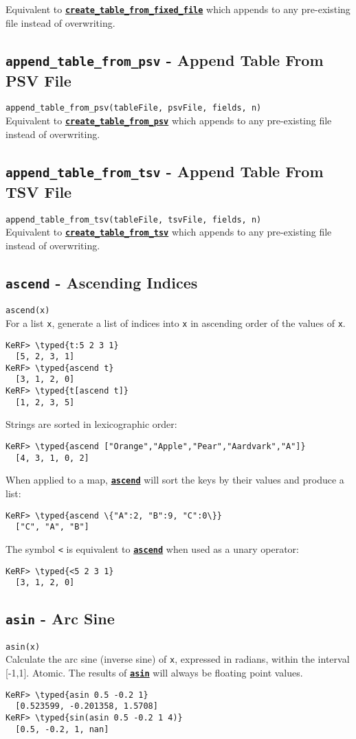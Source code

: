 \documentclass{article}
\newcommand{\typed}[1]{\textcolor{TealBlue}{#1}}
\newcommand{\primdefu}[3]{\subsection{\texttt{#1} - #2}\label{prim:#3}}
\newcommand{\primu}[2]{\hyperref[prim:#2]{\textbf{\texttt{#1}}}}
\newcommand{\primdef}[2]{\primdefu{#1}{#2}{#1}}
\newcommand{\prim}[1]{\primu{#1}{#1}}
\begin{document}
Equivalent to \primu{create\_table\_from\_fixed\_file}{createTableFromFixedFile} which appends to any pre-existing file instead of overwriting.

\primdefu{append\_table\_from\_psv}{Append Table From PSV File}{appendTableFromPsv}
\texttt{append\_table\_from\_psv(tableFile, psvFile, fields, n)}\\

Equivalent to \primu{create\_table\_from\_psv}{createTableFromPsv} which appends to any pre-existing file instead of overwriting.

\primdefu{append\_table\_from\_tsv}{Append Table From TSV File}{appendTableFromTsv}
\texttt{append\_table\_from\_tsv(tableFile, tsvFile, fields, n)}\\

Equivalent to \primu{create\_table\_from\_tsv}{createTableFromTsv} which appends to any pre-existing file instead of overwriting.

\primdef{ascend}{Ascending Indices}
\texttt{ascend(x)}\\

For a list \texttt{x}, generate a list of indices into \texttt{x} in ascending order of the values of \texttt{x}.

\begin{Verbatim}
KeRF> \typed{t:5 2 3 1}
  [5, 2, 3, 1]
KeRF> \typed{ascend t}
  [3, 1, 2, 0]
KeRF> \typed{t[ascend t]}
  [1, 2, 3, 5]
\end{Verbatim}

Strings are sorted in lexicographic order:
\begin{Verbatim}
KeRF> \typed{ascend ["Orange","Apple","Pear","Aardvark","A"]}
  [4, 3, 1, 0, 2]
\end{Verbatim}

When applied to a map, \prim{ascend} will sort the keys by their values and produce a list:
\begin{Verbatim}
KeRF> \typed{ascend \{"A":2, "B":9, "C":0\}}
  ["C", "A", "B"]
\end{Verbatim}

\pagebreak
The symbol \texttt{<} is equivalent to \prim{ascend} when used as a unary operator:
\begin{Verbatim}
KeRF> \typed{<5 2 3 1}
  [3, 1, 2, 0]
\end{Verbatim}

\primdef{asin}{Arc Sine}
\texttt{asin(x)}\\

Calculate the arc sine (inverse sine) of \texttt{x}, expressed in radians, within the interval [-1,1]. Atomic. The results of \prim{asin} will always be floating point values.
\begin{Verbatim}
KeRF> \typed{asin 0.5 -0.2 1}
  [0.523599, -0.201358, 1.5708]
KeRF> \typed{sin(asin 0.5 -0.2 1 4)}
  [0.5, -0.2, 1, nan]
\end{Verbatim}
\end{document}
